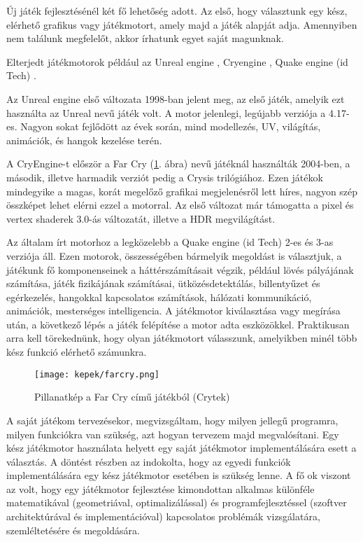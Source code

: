 \label{Chap:problemakor}


Új játék fejlesztésénél két fő lehetőség adott. Az első, hogy választunk egy kész, elérhető grafikus vagy játékmotort, amely majd a játék alapját adja. Amennyiben nem találunk megfelelőt, akkor írhatunk egyet saját magunknak.

Elterjedt játékmotorok például az Unreal engine \cite{Unreal}, Cryengine \cite{CryEngine}, Quake engine (id Tech) \cite{IdTech}.

Az Unreal engine első változata 1998-ban jelent meg, az első játék, amelyik ezt használta az Unreal nevű játék volt. A motor jelenlegi, legújabb verziója a 4.17-es. Nagyon sokat fejlődött az évek során, mind modellezés, UV, világítás, animációk, és hangok kezelése terén.

A CryEngine-t először a Far Cry (\ref{fig:farcry}. ábra) nevű játéknál használták 2004-ben, a második, illetve harmadik verziót pedig a Crysis trilógiához. Ezen játékok mindegyike a magas, korát megelőző grafikai megjelenésről lett híres, nagyon szép összképet lehet elérni ezzel a motorral. Az első változat már támogatta a pixel és vertex shaderek 3.0-ás változatát, illetve a HDR megvilágítást.

Az általam írt motorhoz a legközelebb a Quake engine (id Tech) 2-es és 3-as verziója áll. Ezen motorok, összességében bármelyik megoldást is választjuk, a játékunk fő komponenseinek a háttérszámításait végzik, például lövés pályájának számítása, játék fizikájának számításai, ütközésdetektálás, billentyűzet és egérkezelés, hangokkal kapcsolatos számítások, hálózati kommunikáció, animációk, mesterséges intelligencia. A játékmotor kiválasztása vagy megírása után, a következő lépés a játék felépítése a motor adta eszközökkel. Praktikusan arra kell törekednünk, hogy olyan játékmotort válasszunk, amelyikben minél több kész funkció elérhető számunkra.

\begin{figure}[h]
\centering
\texttt{[image: kepek/farcry.png]}
\caption{Pillanatkép a Far Cry című játékból (Crytek)}
\label{fig:farcry}
\end{figure}


A saját játékom tervezésekor, megvizsgáltam, hogy milyen jellegű programra, milyen funkciókra van szükség, azt hogyan tervezem majd megvalósítani. Egy kész játékmotor használata helyett egy saját játékmotor implementálására esett a választás. A döntést részben az indokolta, hogy az egyedi funkciók implementálására egy kész játékmotor esetében is szükség lenne. A fő ok viszont az volt, hogy egy játékmotor fejlesztése kimondottan alkalmas különféle matematikával (geometriával, optimalizálással) és programfejlesztéssel (szoftver architektúrával és implementációval)  kapcsolatos problémák vizsgálatára, szemléltetésére és megoldására.

